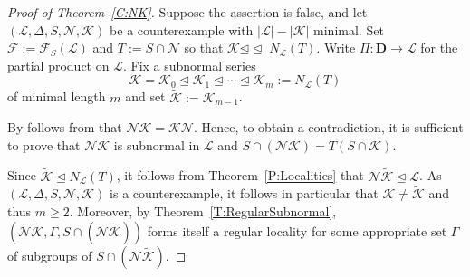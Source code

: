 \documentclass[reqno,11pt]{amsart}
\numberwithin{equation}{section}
\theoremstyle{definition}
\newcommand{\F}{\mathcal{F}}
\renewcommand{\L}{\mathcal{L}}
\newcommand{\tK}{\tilde{\mathcal{K}}}
\newcommand{\N}{\mathcal{N}}
\newcommand{\K}{\mathcal{K}}
\newcommand{\D}{\mathbf{D}}
\newcommand{\subn}{{\unlhd\!\unlhd\;}}
\begin{document}
\begin{proof}[Proof of Theorem~\ref{C:NK}]
Suppose the assertion is false, and let $(\L,\Delta,S,\N,\K)$ be a counterexample with $|\L|-|\K|$ minimal. Set $\F:=\F_S(\L)$ and $T:=S\cap \N$ so that $\K\subn N_\L(T)$. Write $\Pi\colon\D\rightarrow \L$ for the partial product on $\L$. Fix a subnormal series
\[\K=\K_0\unlhd\K_1\unlhd\cdots\unlhd \K_m:=N_\L(T)\]
of minimal length $m$ and set $\tK:=\K_{m-1}$.

\smallskip

By follows from \cite[Lemma~3.2]{Chermak:2015} that $\N\K=\K\N$. Hence, to obtain a contradiction, it is sufficient to prove that $\N\K$ is subnormal in $\L$ and $S\cap (\N\K)=T(S\cap\K)$.

\smallskip

Since $\tK\unlhd N_\L(T)$, it follows from Theorem~\ref{P:Localities} that $\N\tK\unlhd\L$. As $(\L,\Delta,S,\N,\K)$ is a counterexample, it follows in particular that $\K\neq\tK$ and thus $m\geq 2$. Moreover, by Theorem~\ref{T:RegularSubnormal}, $(\N\tK,\Gamma,S\cap (\N\tK))$ forms itself a regular locality for some appropriate set $\Gamma$ of subgroups of $S\cap (\N\tK)$.

\smallskip


\end{proof}
\end{document}
